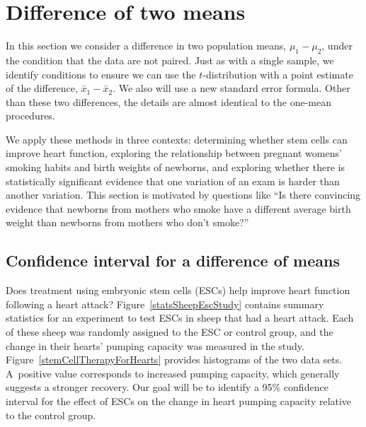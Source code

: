 


\section{Difference of two means}
\label{differenceOfTwoMeans}

\noindent%
In this section we consider a difference in
two population means, $\mu_1 - \mu_2$, under the condition
that the data are not paired.
Just as with a single sample, we identify conditions to ensure
we can use the $t$-distribution with a point estimate
of the difference, $\bar{x}_1 - \bar{x}_2$.
We also will use a new standard error formula.
Other than these two differences, the details are almost
identical to the one-mean procedures.

We apply these methods in three contexts: determining whether
stem cells can improve heart function,
exploring the relationship between pregnant womens' smoking
habits and birth weights of newborns,
and exploring whether there is statistically significant
evidence that one variation of an exam is harder than
another variation.
This section is motivated by questions like
``Is there convincing evidence that newborns from mothers
who smoke have a different average birth weight than newborns
from mothers who don't smoke?''


\subsection{Confidence interval for a difference of means}


Does treatment using embryonic stem cells (ESCs)
help improve heart function following a heart attack?
Figure~\ref{statsSheepEscStudy} contains summary statistics
for an experiment to test ESCs in sheep that had a heart attack.
Each of these sheep was randomly assigned to the ESC
or control group, and the change in their hearts' pumping
capacity was measured in the study.
Figure~\ref{stemCellTherapyForHearts} provides
histograms of the two data sets.
A~positive value corresponds to increased pumping capacity,
which generally suggests a stronger recovery.
Our goal will be to identify a 95\% confidence interval
for the effect of ESCs on the change in heart pumping
capacity relative to the control group.

